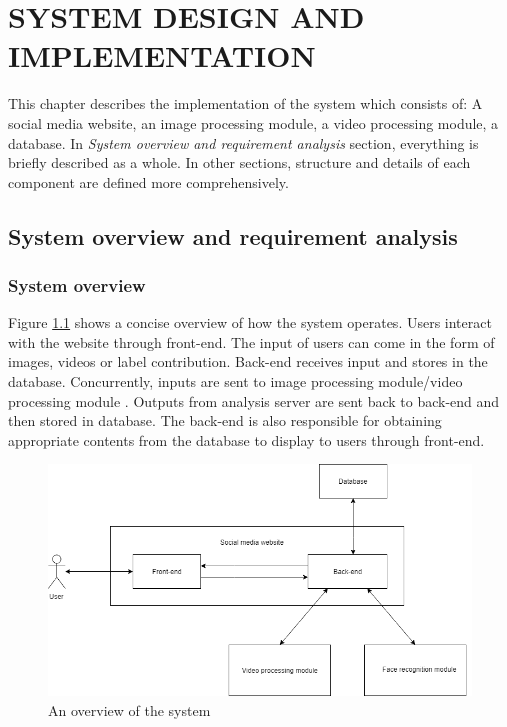 \chapter{SYSTEM DESIGN AND IMPLEMENTATION}

This chapter describes the implementation of the system which consists of: A social media website, an image processing module, a video processing module, a database. In \textit{System overview and requirement analysis} section, everything is briefly described as a whole. In other sections, structure and details of each component are defined more comprehensively.
\section{System overview and requirement analysis}

\subsection{System overview}
Figure \ref{chap4:system_overview_basic} shows a concise overview of how the system operates. Users interact with the website through front-end. The input of users can come in the form of images, videos or label contribution. Back-end receives input and stores in the database. Concurrently, inputs are sent to image processing module/video processing module . Outputs from analysis server are sent back to back-end and then stored in database. The back-end is also responsible for obtaining appropriate contents from the database to display to users through front-end.

\begin{center}
    \begin{figure}[H]
    \centering
    \includegraphics[width=1\columnwidth]{images/chap4/system_overview_basic.png}
    \caption{An overview of the system}
    \label{chap4:system_overview_basic}
    \end{figure}
\end{center}

